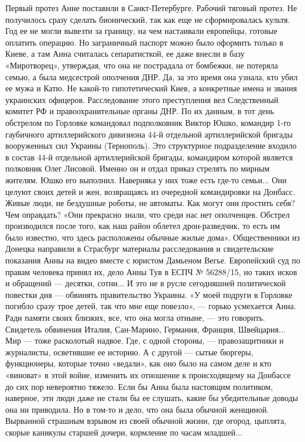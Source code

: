 Первый протез Анне поставили в Санкт-Петербурге. Рабочий тяговый протез. Не получилось сразу сделать бионический, так как еще не сформировалась культя.
Год ее не могли вывезти за границу, на чем настаивали европейцы, готовые оплатить операцию. Но заграничный паспорт можно было оформить только в Киеве, а там Анна считалась сепаратисткой, ее даже внесли в базу «Миротворец», утверждая, что она не пострадала от бомбежки, не потеряла семью, а была медсестрой ополчения ДНР.
Да, за это время она узнала, кто убил ее мужа и Катю. Не какой-то гипотетический Киев, а конкретные имена и звания украинских офицеров. Расследование этого преступления вел Следственный комитет РФ и правоохранительные органы ДНР.
По их данным, в тот день обстрелом по Горловке командовал подполковник Виктор Юшко, командир 1-го гаубичного артиллерийского дивизиона 44-й отдельной артиллерийской бригады вооруженных сил Украины (Тернополь). Это структурное подразделение входило в состав 44-й отдельной артиллерийской бригады, командиром которой является полковник Олег Лисовой. Именно он и отдал приказ стрелять по мирным жителям. Юшко его выполнил.
Наверняка у них тоже есть где-то семьи... Они целуют своих детей и жен, возвращаясь из очередной командировки на Донбасс. Живые люди, не бездушные роботы, не автоматы.
Как могут они простить себя? Чем оправдать?
«Они прекрасно знали, что среди нас нет ополченцев. Обстрел производился после того, как наш район облетел дрон-разведчик, то есть им было известно, что здесь расположены обычные жилые дома».
Общественники из Донецка направили в Страсбург материалы расследования и свидетельские показания Анны на видео вместе с юристом Дамьеном Вегье. Европейский суд по правам человека принял их, дело Анны Тув в ЕСПЧ № 56288/15, но таких исков и обращений — десятки, сотни... И это не в русле сегодняшней политической повестки дня — обвинять правительство Украины.
«У моей подруги в Горловке погибло сразу трое детей, так что мне еще повезло», — горько усмехается Анна.
Ради памяти своих близких, все, что она могла отныне, — это говорить.
Свидетель обвинения
Италия, Сан-Марино, Германия, Франция, Швейцария... Мир — тоже расколотый надвое. Где, с одной стороны, — правозащитники и журналисты, осветившие ее историю. А с другой — сытые бюргеры, функционеры, которые точно «ведали», как оно было на самом деле и кто «виноват» в этой войне, изменить их отношение к происходящему на Донбассе до сих пор невероятно тяжело.
Если бы Анна была настоящим политиком, наверное, эти люди даже не стали бы ее слушать, какие бы убедительные доводы она ни приводила.
Но в том-то и дело, что она была обычной женщиной. Вырванной страшным взрывом из своей обычной жизни, где огород, цыплята, скорые каникулы старшей дочери, кормление по часам младшей...

